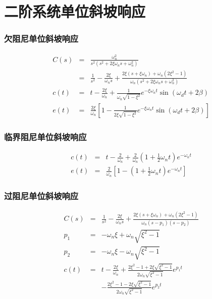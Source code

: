 \documentclass{beamer}
\begin{document}
\section{二阶系统单位斜坡响应}
\label{sec-4}
\begin{frame}
\frametitle{欠阻尼单位斜坡响应}
\label{sec-4-1}

\begin{eqnarray*}
C(s) & =& \frac{\omega_n^2}{s^2(s^2+2\xi\omega_n s+\omega_n^2)}\\
&=&\frac{1}{s^2}-\frac{2\xi}{\omega_n s}+\frac{2\xi(s+\xi\omega_n)+\omega_n(2\xi^2-1)}{\omega_n(s^2+2\xi\omega_n s+\omega_n^2)}\\
c(t)&=&t-\frac{2\xi}{\omega_n}+\frac{1}{\omega_n\sqrt{1-\xi^2}}e^{-\xi\omega_n t}\sin(\omega_d t+2\beta)\\
e(t)&=&\frac{2\xi}{\omega_n}\left[1-\frac{1}{2\xi\sqrt{1-\xi^2}}e^{-\xi\omega_n t}\sin(\omega_d t+2\beta)\right]
\end{eqnarray*}
\end{frame}
\begin{frame}
\frametitle{临界阻尼单位斜坡响应}
\label{sec-4-2}

\begin{eqnarray*}
c(t) & =& t-\frac{2}{\omega_n}+\frac{2}{\omega_n}(1+\frac{1}{2}\omega_n t)e^{-\omega_n t} \\
e(t) &=& \frac{2}{\omega_n}\left[1-(1+\frac{1}{2}\omega_n t)e^{-\omega_n t}\right] 
\end{eqnarray*}
\end{frame}
\begin{frame}
\frametitle{过阻尼单位斜坡响应}
\label{sec-4-3}

\begin{eqnarray*}
C(s) &= &\frac{1}{s^2}-\frac{2\xi}{\omega_n s}+\frac{2\xi(s+\xi\omega_n)+\omega_n(2\xi^2-1)}{\omega_n(s-p_1)(s-p_2)} \\
p_1 &=& -\omega_n\xi+\omega_n\sqrt{\xi^2-1} \\
p_2 &=& -\omega_n\xi-\omega_n\sqrt{\xi^2-1} \\
c(t) &=& t-\frac{2\xi}{\omega_n}+\frac{2\xi^2-1+2\xi\sqrt{\xi^2-1}}{2\omega_n\sqrt{\xi^2-1}}e^{p_1 t} \\
     & & -\frac{2\xi^2-1-2\xi\sqrt{\xi^2-1}}{2\omega_n\sqrt{\xi^2-1}}e^{p_2 t} 
\end{eqnarray*}
\end{frame}
\end{document}
